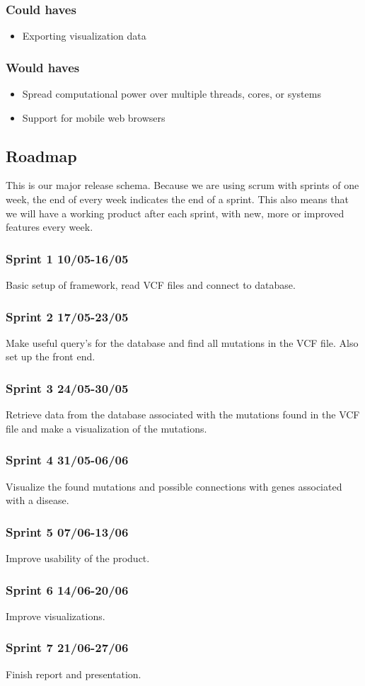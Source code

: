 	\subsubsection{Could haves}
		\begin{itemize}
			\item Exporting visualization data
		\end{itemize}
	
	\subsubsection{Would haves}
		\begin{itemize}
			\item Spread computational power over multiple threads, cores, or systems
			\item Support for mobile web browsers
		\end{itemize}

\subsection{Roadmap}
	This is our major release schema. Because we are using scrum with sprints of one week, the end of every week indicates the end of a sprint. This also means that we will have a working product after each sprint, with new, more or improved features every week.

	\subsubsection*{Sprint 1 10/05-16/05}
		Basic setup of framework, read VCF files and connect to database.
	
	\subsubsection*{Sprint 2 17/05-23/05}
		Make useful query's for the database and find all mutations in the VCF file. Also set up the front end.
	
	\subsubsection*{Sprint 3 24/05-30/05}
		Retrieve data from the database associated with the mutations found in the VCF file and make a visualization of the mutations.
	
	\subsubsection*{Sprint 4 31/05-06/06}
		Visualize the found mutations and possible connections with genes associated with a disease.
	
	\subsubsection*{Sprint 5 07/06-13/06}
		Improve usability of the product.
	
	\subsubsection*{Sprint 6 14/06-20/06}
		Improve visualizations.
	
	\subsubsection*{Sprint 7 21/06-27/06}
		Finish report and presentation.